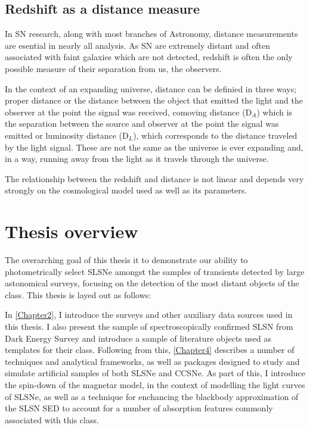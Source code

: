 \subsection{Redshift as a distance measure}
In SN research, along with most branches of Astronomy, distance measurements are esential in nearly all analysis. As SN are extremely distant and often associated with faint galaxies which are not detected, redshift is often the only possible measure of their separation from us, the observers.

In the context of an expanding universe, distance can be definied in three ways; proper distance or the distance between the object that emitted the light and the observer at the point the signal was received, comoving distance (D$_A$) which is the separation between the source and observer at the point the signal was emitted or luminosity distance (D$_L$), which corresponds to the distance traveled by the light signal. These are not the same as the universe is ever expanding and, in a way, running away from the light as it travels through the universe.

The relationship between the redshift and distance is not linear and depends very strongly on the cosmological model used as well as its parameters.


\section{Thesis overview}
The overarching goal of this thesis it to demonstrate our ability to photometrically select SLSNe amongst the samples of transients detected by large astonomical surveys, focusing on the detection of the most distant objects of the class. This thesis is layed out as follows:

In \cref{Chapter2}, I introduce the surveys and other auxiliary data sources used in this thesis. I also present the sample of spectroscopically confirmed SLSN from Dark Energy Survey and introduce a sample of literature objects used as templates for their class. Following from this, \cref{Chapter4} describes a number of techniques and analytical frameworks, as well as packages designed to study and simulate artificial samples of both SLSNe and CCSNe. As part of this, I introduce the spin-down of the magnetar model, in the context of modelling the light curves of SLSNe, as well as a technique for enchancing the blackbody approximation of the SLSN SED to account for a number of absorption features commonly associated with this class.

